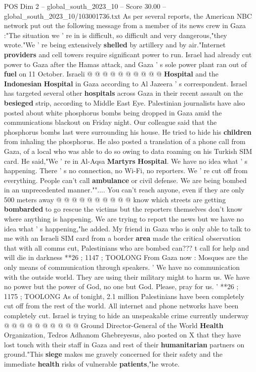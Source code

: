 \begin{textsample}{POS Dim 2 – global\_south\_2023\_10 – Score 30.00 – global\_south\_2023\_10/103001736.txt}
As per several reports, the American NBC network put out the following message from a member of its news crew in Gaza :"The situation we ' re in is difficult, so difficult and very dangerous,"they wrote."We ' re being extensively \textbf{shelled} by artillery and by air."Internet \textbf{providers} and cell towers require significant power to run.
Israel had already cut power to Gaza after the Hamas attack, and Gaza ' s sole power plant ran out of \textbf{fuel} on 11 October.
Israeli @ @ @ @ @ @ @ @ @ @ \textbf{Hospital} and the \textbf{Indonesian} \textbf{Hospital} in Gaza according to Al Jazeera ' s correspondent.
Israel has targeted several other \textbf{hospitals} across Gaza in their recent assault on the \textbf{besieged} strip, according to Middle East Eye.
Palestinian journalists have also posted about white phosphorus bombs being dropped in Gaza amid the communications blackout on Friday night.
Our colleague said that the phosphorus bombs last were surrounding his house.
He tried to hide his \textbf{children} from inhaling the phosphorus.
He also posted a translation of a phone call from Gaza, of a local who was able to do so owing to data roaming on his Turkish SIM card.
He said,"We ' re in Al-Aqsa \textbf{Martyrs} \textbf{Hospital}.
We have no idea what ' s happening.
There ' s no connection, no Wi-Fi, no reporters.
We ' re cut off from everything.
People can't call \textbf{ambulance} or civil defense.
We are being bombed in an unprecedented manner.""....
You can't reach anyone, even if they are only 500 meters away @ @ @ @ @ @ @ @ @ @ know which streets are getting \textbf{bombarded} to go rescue the victims but the reporters themselves don't know where anything is happening.
We are trying to report the news but we have no idea what ' s happening,"he added.
My friend in Gaza who is only able to talk to me with an Israeli SIM card from a border \textbf{area} made the critical observation that with all comms cut, Palestinians who are bombed can??? t call for help and will die in darkness **26 ; 1147 ; TOOLONG From Gaza now : Mosques are the only means of communication through speakers. ' We have no communication with the outside world.
They are using their military might to harm us.
We have no power but the power of God, no one but God.
Please, pray for us. ' **26 ; 1175 ; TOOLONG As of tonight, 2.1 million Palestinians have been completely cut off from the rest of the world.
All internet and phone networks have been completely cut.
Israel is trying to hide an unspeakable crime currently underway @ @ @ @ @ @ @ @ @ @ Ground Director-General of the World \textbf{Health} Organization, Tedros Adhanom Ghebreyesus, also posted on X that they have lost touch with their staff in Gaza and rest of their \textbf{humanitarian} partners on ground."This \textbf{siege} makes me gravely concerned for their safety and the immediate \textbf{health} risks of vulnerable \textbf{patients},"he wrote.

\end{textsample}
